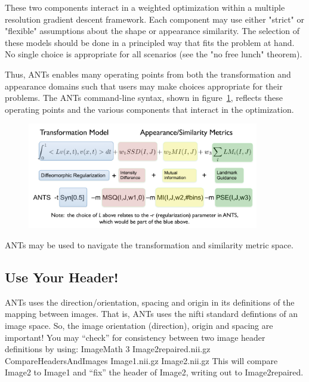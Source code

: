 \documentclass{InsightArticle}
\begin{document}
These two components interact in a weighted optimization within a multiple resolution gradient descent framework. Each component may use either "strict" or "flexible" assumptions about the shape or appearance similarity. The selection of these models should be done in a principled way that fits the problem at hand. No single choice is appropriate for all scenarios (see the "no free lunch" theorem). 

Thus, ANTs enables many operating points from both the transformation and appearance domains such that users may make choices appropriate for their problems. The ANTs command-line syntax, shown in figure~\ref{fig:cmd}, reflects these operating points and the various components that interact in the optimization.
\begin{figure}
\includegraphics[width=0.9\textwidth]{Figures/ANTSSyntax.pdf} 
\vspace{-0.1in}
\label{fig:cmd}
\end{figure}
ANTs may be used to navigate the transformation and similarity metric space. 
\subsection{Use Your Header!} ANTs uses the direction/orientation, spacing
and origin in its definitions of the mapping between images.  That is,
ANTs uses the nifti standard defintions of an image space.  So, the
image orientation (direction), origin and spacing are important!  You
may ``check'' for consistency between two image header definitions by
using: ImageMath 3 Image2repaired.nii.gz CompareHeadersAndImages
Image1.nii.gz Image2.nii.gz \newline This will compare Image2 to
Image1 and ``fix'' the header of Image2, writing out to
Image2repaired.
\end{document}
